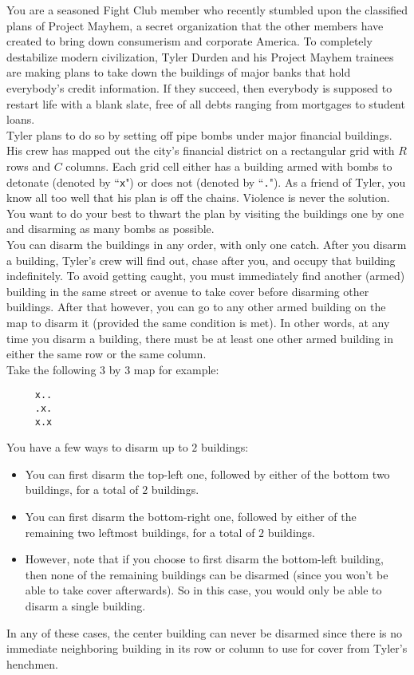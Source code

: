 
\noindent You are a seasoned Fight Club member who recently stumbled upon the classified plans of Project Mayhem, a secret organization that the other members have created to bring down consumerism and corporate America. To completely destabilize modern civilization, Tyler Durden and his Project Mayhem trainees are making plans to take down the buildings of major banks that hold everybody's credit information. If they succeed, then everybody is supposed to restart life with a blank slate, free of all debts ranging from mortgages to student loans.\\

Tyler plans to do so by setting off pipe bombs under major financial buildings. His crew has mapped out the city's financial district on a rectangular grid with $R$ rows and $C$ columns. Each grid cell either has a building armed with bombs to detonate (denoted by ``\texttt{x}") or does not (denoted by ``\texttt{.}"). As a friend of Tyler, you know all too well that his plan is off the chains. Violence is never the solution. You want to do your best to thwart the plan by visiting the buildings one by one and disarming as many bombs as possible.\\

You can disarm the buildings in any order, with only one catch. After you disarm a building, Tyler's crew will find out, chase after you, and occupy that building indefinitely. To avoid getting caught, you must immediately find another (armed) building in the same street or avenue to take cover before disarming other buildings. After that however, you can go to any other armed building on the map to disarm it (provided the same condition is met). In other words, at any time you disarm a building, there must be at least one other armed building in either the same row or the same column.\\

\noindent Take the following $3$ by $3$ map for example:

\begin{verbatim}
     x..
     .x.
     x.x
\end{verbatim}

\noindent You have a few ways to disarm up to $2$ buildings:
\begin{itemize}
\item You can first disarm the top-left one, followed by either of the bottom two buildings, for a total of $2$ buildings.
\item You can first disarm the bottom-right one, followed by either of the remaining two leftmost buildings, for a total of $2$ buildings.
\item However, note that if you choose to first disarm the bottom-left building, then none of the remaining buildings can be disarmed (since you won't be able to take cover afterwards). So in this case, you would only be able to disarm a single building.
\end{itemize}
In any of these cases, the center building can never be disarmed since there is no immediate neighboring building in its row or column to use for cover from Tyler's henchmen.\\

